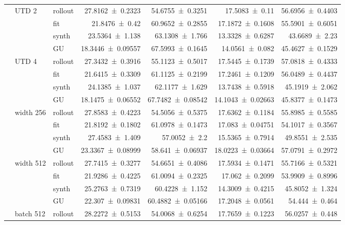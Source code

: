 {\begin{longtable}{@{}lllrrrr@{}}
     & UTD 2 & rollout & \num{27.8162+-0.2323} & \num{54.6755+-0.3251} & \num{17.5083+-0.11} & \num{56.6956+-0.4403} \\
     &  & fit & \num{21.8476+-0.42} & \num{60.9652+-0.2855} & \num{17.1872+-0.1608} & \num{55.5901+-0.6051} \\
     &  & synth & \num{23.5364+-1.138} & \num{63.1308+-1.766} & \num{13.3328+-0.6287} & \num{43.6689+-2.23} \\
     &  & GU & \num{18.3446+-0.09557} & \num{67.5993+-0.1645} & \num{14.0561+-0.082} & \num{45.4627+-0.1529} \\
    \addlinespace[2pt]
     & UTD 4 & rollout & \num{27.3432+-0.3916} & \num{55.1123+-0.5017} & \num{17.5445+-0.1739} & \num{57.0818+-0.4333} \\
     &  & fit & \num{21.6415+-0.3309} & \num{61.1125+-0.2199} & \num{17.2461+-0.1209} & \num{56.0489+-0.4437} \\
     &  & synth & \num{24.1385+-1.037} & \num{62.1177+-1.629} & \num{13.7438+-0.5918} & \num{45.1919+-2.062} \\
     &  & GU & \num{18.1475+-0.06552} & \num{67.7482+-0.08542} & \num{14.1043+-0.02663} & \num{45.8377+-0.1473} \\
    \addlinespace[2pt]
     & width 256 & rollout & \num{27.8583+-0.4223} & \num{54.5056+-0.5375} & \num{17.6362+-0.1184} & \num{55.8985+-0.5585} \\
     &  & fit & \num{21.8192+-0.1802} & \num{61.0978+-0.1473} & \num{17.083+-0.04751} & \num{54.1017+-0.3567} \\
     &  & synth & \num{27.4583+-1.409} & \num{57.0052+-2.2} & \num{15.5365+-0.7914} & \num{49.8551+-2.535} \\
     &  & GU & \num{23.3367+-0.08999} & \num{58.641+-0.06937} & \num{18.0223+-0.03664} & \num{57.0791+-0.2972} \\
    \addlinespace[2pt]
     & width 512 & rollout & \num{27.7415+-0.3277} & \num{54.6651+-0.4086} & \num{17.5934+-0.1471} & \num{55.7166+-0.5321} \\
     &  & fit & \num{21.9286+-0.4225} & \num{61.0094+-0.2325} & \num{17.062+-0.2099} & \num{53.9909+-0.8996} \\
     &  & synth & \num{25.2763+-0.7319} & \num{60.4228+-1.152} & \num{14.3009+-0.4215} & \num{45.8052+-1.324} \\
     &  & GU & \num{22.307+-0.09831} & \num{60.4882+-0.05166} & \num{17.2048+-0.0561} & \num{54.444+-0.464} \\
    \addlinespace[2pt]
     & batch 512 & rollout & \num{28.2272+-0.5153} & \num{54.0068+-0.6254} & \num{17.7659+-0.1223} & \num{56.0257+-0.448} \\

\end{longtable}}

